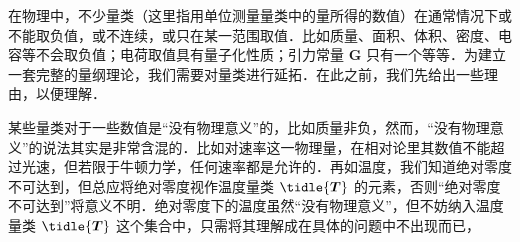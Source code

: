 在物理中，不少量类（这里指用单位测量量类中的量所得的数值）在通常情况下或不能取负值，或不连续，或只在某一范围取值．比如质量、面积、体积、密度、电容等不会取负值；电荷取值具有量子化性质；引力常量 $\boldsymbol{G}$ 只有一个等等．为建立一套完整的量纲理论，我们需要对量类进行延拓．在此之前，我们先给出一些理由，以便理解．

某些量类对于一些数值是“没有物理意义”的，比如质量非负，然而，“没有物理意义”的说法其实是非常含混的．比如对速率这一物理量，在相对论里其数值不能超过光速，但若限于牛顿力学，任何速率都是允许的．再如温度，我们知道绝对零度不可达到，但总应将绝对零度视作温度量类 $\tidle{\boldsymbol{T}}$ 的元素，否则“绝对零度不可达到”将意义不明．绝对零度下的温度虽然“没有物理意义”，但不妨纳入温度量类 $\tidle{\boldsymbol{T}}$ 这个集合中，只需将其理解成在具体的问题中不出现而已，